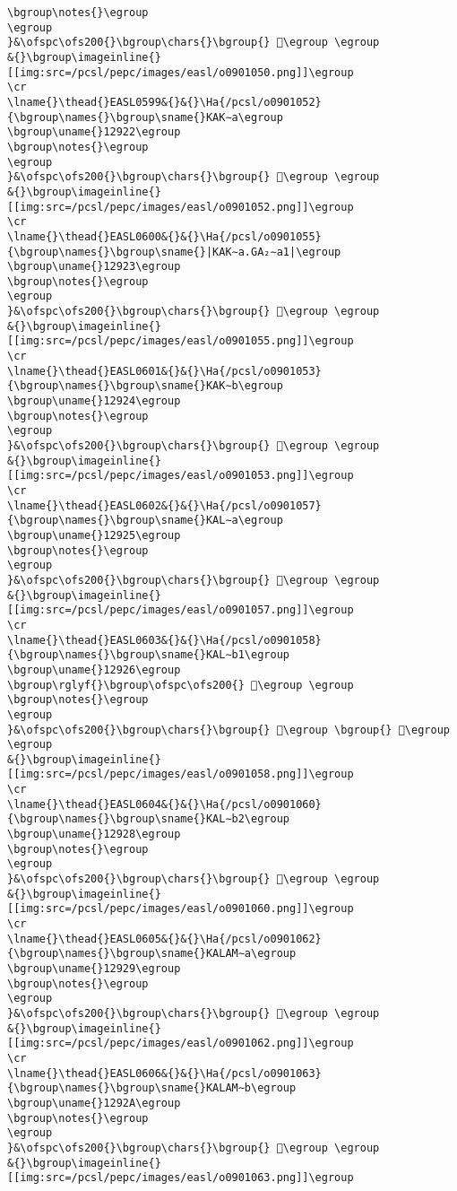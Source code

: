 \begin{verbatim}
\bgroup\notes{}\egroup
\egroup
}&\ofspc\ofs200{}\bgroup\chars{}\bgroup{} 𒤡\egroup \egroup
&{}\bgroup\imageinline{}[[img:src=/pcsl/pepc/images/easl/o0901050.png]]\egroup
\cr
\lname{}\thead{}EASL0599&{}&{}\Ha{/pcsl/o0901052}{\bgroup\names{}\bgroup\sname{}KAK∼a\egroup
\bgroup\uname{}12922\egroup
\bgroup\notes{}\egroup
\egroup
}&\ofspc\ofs200{}\bgroup\chars{}\bgroup{} 𒤢\egroup \egroup
&{}\bgroup\imageinline{}[[img:src=/pcsl/pepc/images/easl/o0901052.png]]\egroup
\cr
\lname{}\thead{}EASL0600&{}&{}\Ha{/pcsl/o0901055}{\bgroup\names{}\bgroup\sname{}|KAK∼a.GA₂∼a1|\egroup
\bgroup\uname{}12923\egroup
\bgroup\notes{}\egroup
\egroup
}&\ofspc\ofs200{}\bgroup\chars{}\bgroup{} 𒤣\egroup \egroup
&{}\bgroup\imageinline{}[[img:src=/pcsl/pepc/images/easl/o0901055.png]]\egroup
\cr
\lname{}\thead{}EASL0601&{}&{}\Ha{/pcsl/o0901053}{\bgroup\names{}\bgroup\sname{}KAK∼b\egroup
\bgroup\uname{}12924\egroup
\bgroup\notes{}\egroup
\egroup
}&\ofspc\ofs200{}\bgroup\chars{}\bgroup{} 𒤤\egroup \egroup
&{}\bgroup\imageinline{}[[img:src=/pcsl/pepc/images/easl/o0901053.png]]\egroup
\cr
\lname{}\thead{}EASL0602&{}&{}\Ha{/pcsl/o0901057}{\bgroup\names{}\bgroup\sname{}KAL∼a\egroup
\bgroup\uname{}12925\egroup
\bgroup\notes{}\egroup
\egroup
}&\ofspc\ofs200{}\bgroup\chars{}\bgroup{} 𒤥\egroup \egroup
&{}\bgroup\imageinline{}[[img:src=/pcsl/pepc/images/easl/o0901057.png]]\egroup
\cr
\lname{}\thead{}EASL0603&{}&{}\Ha{/pcsl/o0901058}{\bgroup\names{}\bgroup\sname{}KAL∼b1\egroup
\bgroup\uname{}12926\egroup
\bgroup\rglyf{}\bgroup\ofspc\ofs200{} 𒤦\egroup \egroup
\bgroup\notes{}\egroup
\egroup
}&\ofspc\ofs200{}\bgroup\chars{}\bgroup{} 𒤦\egroup \bgroup{} 𒤧\egroup \egroup
&{}\bgroup\imageinline{}[[img:src=/pcsl/pepc/images/easl/o0901058.png]]\egroup
\cr
\lname{}\thead{}EASL0604&{}&{}\Ha{/pcsl/o0901060}{\bgroup\names{}\bgroup\sname{}KAL∼b2\egroup
\bgroup\uname{}12928\egroup
\bgroup\notes{}\egroup
\egroup
}&\ofspc\ofs200{}\bgroup\chars{}\bgroup{} 𒤨\egroup \egroup
&{}\bgroup\imageinline{}[[img:src=/pcsl/pepc/images/easl/o0901060.png]]\egroup
\cr
\lname{}\thead{}EASL0605&{}&{}\Ha{/pcsl/o0901062}{\bgroup\names{}\bgroup\sname{}KALAM∼a\egroup
\bgroup\uname{}12929\egroup
\bgroup\notes{}\egroup
\egroup
}&\ofspc\ofs200{}\bgroup\chars{}\bgroup{} 𒤩\egroup \egroup
&{}\bgroup\imageinline{}[[img:src=/pcsl/pepc/images/easl/o0901062.png]]\egroup
\cr
\lname{}\thead{}EASL0606&{}&{}\Ha{/pcsl/o0901063}{\bgroup\names{}\bgroup\sname{}KALAM∼b\egroup
\bgroup\uname{}1292A\egroup
\bgroup\notes{}\egroup
\egroup
}&\ofspc\ofs200{}\bgroup\chars{}\bgroup{} 𒤪\egroup \egroup
&{}\bgroup\imageinline{}[[img:src=/pcsl/pepc/images/easl/o0901063.png]]\egroup

\end{verbatim}

